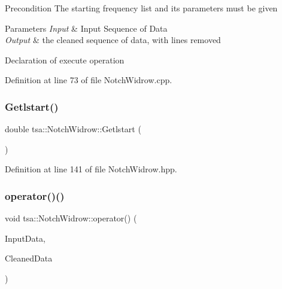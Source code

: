 \begin{DoxyPrecond}{Precondition}
The starting frequency list and its parameters must be given
\end{DoxyPrecond}

\begin{DoxyParams}{Parameters}
{\em Input} & Input Sequence of Data\\
\hline
{\em Output} & the cleaned sequence of data, with lines removed\\
\hline
\end{DoxyParams}
Declaration of execute operation 

Definition at line 73 of file Notch\+Widrow.\+cpp.

\mbox{\label{classtsa_1_1_notch_widrow_a036b5be767039465601378f76a4f013d}} 
\subsubsection{\texorpdfstring{Getlstart()}{Getlstart()}}
{\footnotesize\ttfamily double tsa\+::\+Notch\+Widrow\+::\+Getlstart (\begin{DoxyParamCaption}{ }\end{DoxyParamCaption})\hspace{0.3cm}{\ttfamily [inline]}}



Definition at line 141 of file Notch\+Widrow.\+hpp.

\mbox{\label{classtsa_1_1_notch_widrow_af11452f632cdcb6587b6e38902739418}} 
\subsubsection{\texorpdfstring{operator()()}{operator()()}\hspace{0.1cm}{\footnotesize\ttfamily [1/2]}}
{\footnotesize\ttfamily void tsa\+::\+Notch\+Widrow\+::operator() (\begin{DoxyParamCaption}\item[{\hyperlink{namespacetsa_ac599574bcc094eda25613724b8f3ca9e}{Seq\+View\+Double} \&}]{Input\+Data,  }\item[{\hyperlink{namespacetsa_ac599574bcc094eda25613724b8f3ca9e}{Seq\+View\+Double} \&}]{Cleaned\+Data }\end{DoxyParamCaption})}


